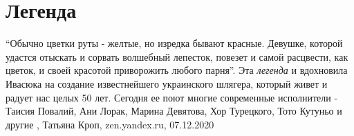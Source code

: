  
 
 
 
 
\chapter{Легенда}

\enquote{Обычно цветки руты - желтые, но изредка бывают красные. Девушке,
которой удастся отыскать и сорвать волшебный лепесток, повезет и самой
расцвести, как цветок, и своей красотой приворожить любого парня}.  Эта
\emph{легенда} и вдохновила Ивасюка на создание известнейшего украинского
шлягера, который живет и радует нас целых 50 лет. Сегодня ее поют многие
современные исполнители - Таисия Повалий, Ани Лорак, Марина Девятова, Хор
Турецкого, Тото Кутуньо и другие
, 
Татьяна Кроп, zen.yandex.ru, 07.12.2020

